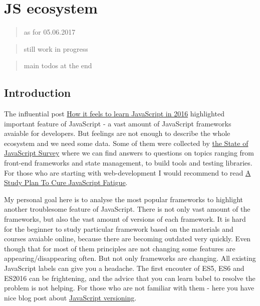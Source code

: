 \section{JS ecosystem}\label{js-ecosystem}

\begin{quote}
as for 05.06.2017
\end{quote}

\begin{quote}
still work in progress
\end{quote}

\begin{quote}
main todos at the end
\end{quote}

\subsection{Introduction}\label{introduction}

The influential post
\href{https://hackernoon.com/how-it-feels-to-learn-javascript-in-2016-d3a717dd577f}{How
it feels to learn JavaScript in 2016} highlighted important feature of
JavaScript - a vast amount of JavaScript frameworks avaiable for
developers. But feelings are not enough to describe the whole ecosystem
and we need some data. Some of them were collected by
\href{http://stateofjs.com/}{the State of JavaScript Survey} where we
can find answers to questions on topics ranging from front-end
frameworks and state management, to build tools and testing libraries.
For those who are starting with web-development I would recommend to
read
\href{https://medium.freecodecamp.com/a-study-plan-to-cure-javascript-fatigue-8ad3a54f2eb1}{A
Study Plan To Cure JavaScript Fatigue}.

My personal goal here is to analyse the most popular frameworks to
highlight another troublesome feature of JavaScript. There is not only
vast amount of the frameworks, but also the vast amount of versions of
each framework. It is hard for the beginner to study particular
framework based on the materials and courses avaiable online, because
there are becoming outdated very quickly. Even though that for most of
them principles are not changing some features are
appearing/disappearing often. But not only frameworks are changing. All
existing JavaScript labels can give you a headache. The first encouter
of ES5, ES6 and ES2016 can be frightening, and the advice that you can
learn babel to resolve the problem is not helping. For those who are not
familiar with them - here you have nice blog post about
\href{https://benmccormick.org/2015/09/14/es5-es6-es2016-es-next-whats-going-on-with-javascript-versioning/}{JavaScript
versioning}.

